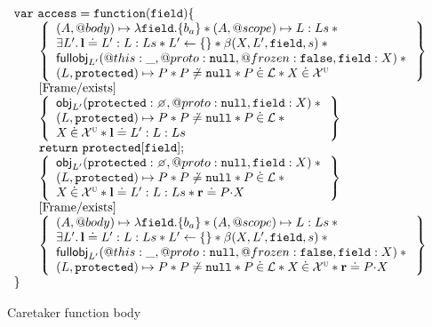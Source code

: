 \documentclass[a4paper,notitlepage]{report}
\begin{document}
\begin{figure}
  \[
    \begin{array}{l}
      \jsvar{access = function(field) \{} \\
      \indblock{
        \logic{
          (A, @body) \mapsto \lambda \js{field}.\{b_a\} \sep
            (A, @scope) \mapsto L:Ls \sep {} \\
          \exists L' \st \ls \doteq L' : L : Ls \sep
            L' \bp \{\} \sep \bpGen(X, L', \js{field}, s) \sep {} \\
          \fullobj_{L'}(@this: \_, @proto: \nil, @frozen: \false, \js{field}: X)
            \sep {} \\
          (L, \js{protected}) \mapsto P \sep P \not\doteq \nil \sep P \dotin \loc
            \sep X \dotin \uvars
        } \\
        \step{Frame/exists} \\
        \logic{
          \obj_{L'}(\js{protected}: \none, @proto: \nil, \js{field}: X) \sep {} \\
          (L, \js{protected}) \mapsto P \sep P \not\doteq \nil \sep P \dotin \loc
            \sep {} \\
          X \dotin \uvars \sep \ls \doteq L':L:Ls
        } \\
        \js{return\ protected[field];} \\
        \logic{
          \obj_{L'}(\js{protected}: \none, @proto: \nil, \js{field}: X) \sep {} \\
          (L, \js{protected}) \mapsto P \sep
          P \not\doteq \nil \sep P \dotin \loc \sep {} \\
          X \dotin \uvars \sep \ls \doteq L':L:Ls \sep \rv \doteq \fld{P}{X}
        } \\
        \step{Frame/exists} \\
        \logic{
          (A, @body) \mapsto \lambda \js{field}.\{b_a\} \sep
            (A, @scope) \mapsto L:Ls \sep {} \\
          \exists L' \st \ls \doteq L' : L : Ls \sep
            L' \bp \{\} \sep \bpGen(X, L', \js{field}, s) \sep {} \\
          \fullobj_{L'}(@this: \_, @proto: \nil, @frozen: \false, \js{field}: X)
            \sep {} \\
          (L, \js{protected}) \mapsto P \sep P \not\doteq \nil \sep P \dotin \loc
            \sep X \dotin \uvars \sep \rv \doteq \fld{P}{X}
        }
      }
      \js{\}}
    \end{array}
  \]
  \caption{Caretaker  function body}
  \label{rr-access}
\end{figure}
\end{document}
